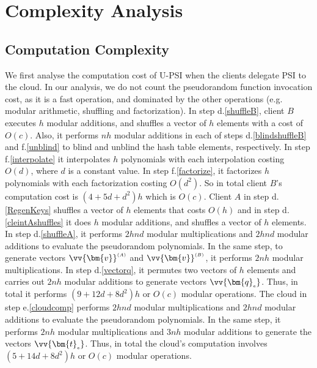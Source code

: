 \section{Complexity Analysis}
\vspace{-2mm}
\subsection{Computation Complexity} \label{compcomp}

We first analyse the computation cost of U-PSI when the clients delegate PSI to the cloud. In our analysis, we do not count the pseudorandom function invocation cost, as it is a fast operation, and dominated by the other operations (e.g. modular arithmetic, shuffling and factorization). In step d.\ref{shuffleB}, client $B$ executes $h$ modular additions, and  shuffles a vector of $h$ elements with a cost of $O(c)$. Also, it performs  $nh$ modular additions in each of steps d.\ref{blindshuffleB} and f.\ref{unblind} to  blind and unblind  the hash table elements,  respectively. In step f.\ref{interpolate} it interpolates $h$ polynomials with each interpolation costing $O(d)$, where $d$ is a constant value. In step f.\ref{factorize}, it factorizes $h$ polynomials with each factorization costing $O(d^{\scriptscriptstyle 2})$. So in total client $B$'s computation cost is $(4+5d+d^{\scriptscriptstyle 2})h$ which is $O(c)$. Client $A$ in step  d.\ref{RegenKeys}  shuffles a vector of $h$ elements that costs $O(h)$ and in  step d.\ref{cleintAshuffles} it does $h$ modular additions, and shuffles a vector of $h$ elements. In step d.\ref{shuffleA}, it performs $2hnd$ modular multiplications and $2hnd$ modular additions to evaluate the pseudorandom polynomials. In the same step, to generate vectors $\vv{\bm{v}}^{\scriptscriptstyle (A)}$ and $\vv{\bm{v}}^{\scriptscriptstyle (B)}$, it performs $2nh$ modular multiplications. In step d.\ref{vectorq}, it permutes two vectors of  $h$ elements and carries out $2nh$ modular additions to generate  vectors $\vv{\bm{q}_{\scriptscriptstyle e}}$. Thus, in total it performs $(9+12d+8d^{\scriptscriptstyle 2})h$ or $O(c)$ modular operations. The cloud in step e.\ref{cloudcomp} performs  $2hnd$ modular multiplications and $2hnd$ modular additions to evaluate the pseudorandom polynomials. In the same step, it performs $2nh$ modular multiplications and $3nh$ modular additions to generate the vectors $\vv{\bm{t}_{\scriptscriptstyle e}}$. Thus, in total the cloud's computation involves $(5+14d+8d^{\scriptscriptstyle 2})h$ or  $O(c)$ modular operations. 

